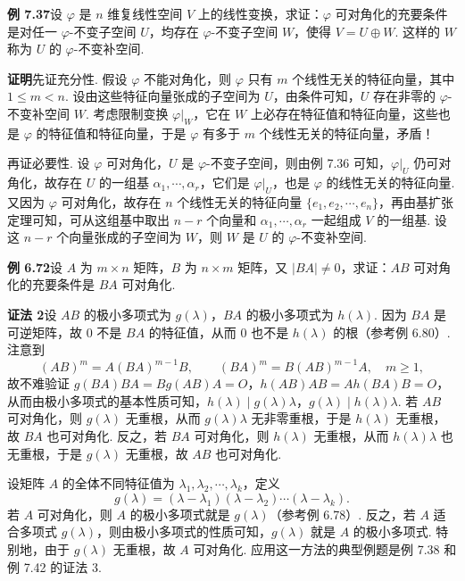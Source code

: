 \documentclass[UTF8, 12pt, fontset=fandol, oneside]{ctexart}
\begin{document}
\noindent\textbf{例 7.37}\quad 设 $\varphi$ 是 $n$ 维复线性空间 $V$ 上的线性变换，求证：$\varphi$ 可对角化的充要条件是对任一 $\varphi$-不变子空间 $U$，均存在 $\varphi$-不变子空间 $W$，使得 $V=U\oplus W$. 这样的 $W$ 称为 $U$ 的 $\varphi$-不变补空间.

\noindent\textbf{证明}\quad 先证充分性. 假设 $\varphi$ 不能对角化，则 $\varphi$ 只有 $m$ 个线性无关的特征向量，其中 $1\le m<n$. 设由这些特征向量张成的子空间为 $U$，由条件可知，$U$ 存在非零的 $\varphi$-不变补空间 $W$. 考虑限制变换 $\varphi|_W$，它在 $W$ 上必存在特征值和特征向量，这些也是 $\varphi$ 的特征值和特征向量，于是 $\varphi$ 有多于 $m$ 个线性无关的特征向量，矛盾！

再证必要性. 设 $\varphi$ 可对角化，$U$ 是 $\varphi$-不变子空间，则由例 7.36 可知，$\varphi|_U$ 仍可对角化，故存在 $U$ 的一组基 $\alpha_1,\cdots,\alpha_r$，它们是 $\varphi|_U$，也是 $\varphi$ 的线性无关的特征向量. 又因为 $\varphi$ 可对角化，故存在 $n$ 个线性无关的特征向量 $\{e_1,e_2,\cdots,e_n\}$，再由基扩张定理可知，可从这组基中取出 $n-r$ 个向量和 $\alpha_1,\cdots,\alpha_r$ 一起组成 $V$ 的一组基. 设这 $n-r$ 个向量张成的子空间为 $W$，则 $W$ 是 $U$ 的 $\varphi$-不变补空间.

\noindent\textbf{例 6.72}\quad 设 $A$ 为 $m\times n$ 矩阵，$B$ 为 $n\times m$ 矩阵，又 $|BA|\ne 0$，求证：$AB$ 可对角化的充要条件是 $BA$ 可对角化.

\noindent\textbf{证法 2}\quad 设 $AB$ 的极小多项式为 $g(\lambda)$，$BA$ 的极小多项式为 $h(\lambda)$. 因为 $BA$ 是可逆矩阵，故 $0$ 不是 $BA$ 的特征值，从而 $0$ 也不是 $h(\lambda)$ 的根（参考例 6.80）. 注意到
\[
(AB)^m=A(BA)^{m-1}B,\qquad (BA)^m=B(AB)^{m-1}A,\quad m\ge 1,
\]
故不难验证 $g(BA)BA=Bg(AB)A=O$，$h(AB)AB=Ah(BA)B=O$，从而由极小多项式的基本性质可知，$h(\lambda)\mid g(\lambda)\lambda$，$g(\lambda)\mid h(\lambda)\lambda$. 若 $AB$ 可对角化，则 $g(\lambda)$ 无重根，从而 $g(\lambda)\lambda$ 无非零重根，于是 $h(\lambda)$ 无重根，故 $BA$ 也可对角化. 反之，若 $BA$ 可对角化，则 $h(\lambda)$ 无重根，从而 $h(\lambda)\lambda$ 也无重根，于是 $g(\lambda)$ 无重根，故 $AB$ 也可对角化.

设矩阵 $A$ 的全体不同特征值为 $\lambda_1,\lambda_2,\cdots,\lambda_k$，定义
\[
g(\lambda)=(\lambda-\lambda_1)(\lambda-\lambda_2)\cdots(\lambda-\lambda_k).
\]
若 $A$ 可对角化，则 $A$ 的极小多项式就是 $g(\lambda)$（参考例 6.78）. 反之，若 $A$ 适合多项式 $g(\lambda)$，则由极小多项式的性质可知，$g(\lambda)$ 就是 $A$ 的极小多项式. 特别地，由于 $g(\lambda)$ 无重根，故 $A$ 可对角化. 应用这一方法的典型例题是例 7.38 和例 7.42 的证法 3.
\end{document}

